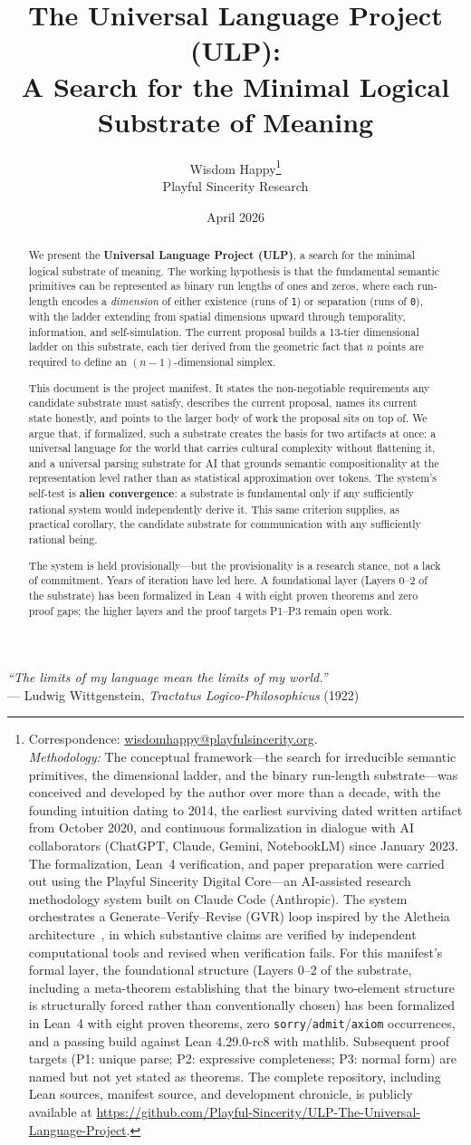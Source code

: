 \documentclass[12pt]{article}
\title{The Universal Language Project (ULP): \\
A Search for the Minimal Logical Substrate of Meaning}
\author{Wisdom Happy\thanks{Correspondence: \href{mailto:wisdomhappy@playfulsincerity.org}{wisdomhappy@playfulsincerity.org}. \\[0.5em]
\textit{Methodology:} The conceptual framework---the search for irreducible semantic primitives, the dimensional ladder, and the binary run-length substrate---was conceived and developed by the author over more than a decade, with the founding intuition dating to 2014, the earliest surviving dated written artifact from October 2020, and continuous formalization in dialogue with AI collaborators (ChatGPT, Claude, Gemini, NotebookLM) since January 2023. The formalization, Lean~4 verification, and paper preparation were carried out using the Playful Sincerity Digital Core---an AI-assisted research methodology system built on Claude Code (Anthropic). The system orchestrates a Generate--Verify--Revise (GVR) loop inspired by the Aletheia architecture~\cite{feng2026aletheia}, in which substantive claims are verified by independent computational tools and revised when verification fails. For this manifest's formal layer, the foundational structure (Layers 0--2 of the substrate, including a meta-theorem establishing that the binary two-element structure is structurally forced rather than conventionally chosen) has been formalized in Lean~4 with eight proven theorems, zero \texttt{sorry}/\texttt{admit}/\texttt{axiom} occurrences, and a passing build against Lean 4.29.0-rc8 with mathlib. Subsequent proof targets (P1: unique parse; P2: expressive completeness; P3: normal form) are named but not yet stated as theorems. The complete repository, including Lean sources, manifest source, and development chronicle, is publicly available at \url{https://github.com/Playful-Sincerity/ULP-The-Universal-Language-Project}.} \\[0.3em]
Playful Sincerity Research}
\date{April 2026}
\begin{document}
\maketitle

\begin{center}
\textit{``The limits of my language mean the limits of my world.''}\\[0.3em]
--- Ludwig Wittgenstein, \textit{Tractatus Logico-Philosophicus} (1922)
\end{center}
\vspace{1em}

\begin{abstract}
We present the \textbf{Universal Language Project (ULP)}, a search for the minimal logical substrate of meaning. The working hypothesis is that the fundamental semantic primitives can be represented as binary run lengths of ones and zeros, where each run-length encodes a \emph{dimension} of either existence (runs of \texttt{1}) or separation (runs of \texttt{0}), with the ladder extending from spatial dimensions upward through temporality, information, and self-simulation. The current proposal builds a 13-tier dimensional ladder on this substrate, each tier derived from the geometric fact that $n$ points are required to define an $(n-1)$-dimensional simplex.

This document is the project manifest. It states the non-negotiable requirements any candidate substrate must satisfy, describes the current proposal, names its current state honestly, and points to the larger body of work the proposal sits on top of. We argue that, if formalized, such a substrate creates the basis for two artifacts at once: a universal language for the world that carries cultural complexity without flattening it, and a universal parsing substrate for AI that grounds semantic compositionality at the representation level rather than as statistical approximation over tokens. The system's self-test is \textbf{alien convergence}: a substrate is fundamental only if any sufficiently rational system would independently derive it. This same criterion supplies, as practical corollary, the candidate substrate for communication with any sufficiently rational being.

The system is held provisionally---but the provisionality is a research stance, not a lack of commitment. Years of iteration have led here. A foundational layer (Layers 0--2 of the substrate) has been formalized in Lean~4 with eight proven theorems and zero proof gaps; the higher layers and the proof targets P1--P3 remain open work.
\end{abstract}
\end{document}
